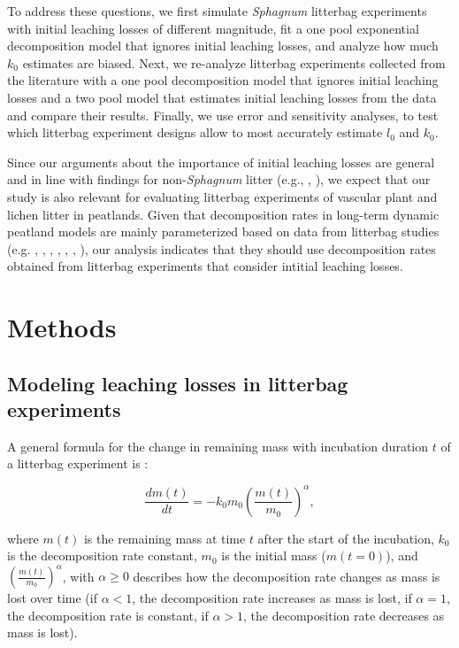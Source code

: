 \documentclass[bg, manuscript]{copernicus}
\begin{document}
To address these questions, we first simulate \emph{Sphagnum} litterbag experiments with initial leaching losses of different magnitude, fit a one pool exponential decomposition model that ignores initial leaching losses, and analyze how much \(k_0\) estimates are biased. Next, we re-analyze litterbag experiments collected from the literature with a one pool decomposition model that ignores initial leaching losses and a two pool model that estimates initial leaching losses from the data and compare their results. Finally, we use error and sensitivity analyses, to test which litterbag experiment designs allow to most accurately estimate \(l_0\) and \(k_0\).

Since our arguments about the importance of initial leaching losses are general and in line with findings for non-\emph{Sphagnum} litter (e.g., \citet{Barlocher.1997}, \citet{Lind.2022}), we expect that our study is also relevant for evaluating litterbag experiments of vascular plant and lichen litter in peatlands. Given that decomposition rates in long-term dynamic peatland models are mainly parameterized based on data from litterbag studies (e.g. \citet{Frolking.2001}, \citet{Bauer.2004}, \citet{Heijmans.2008}, \citet{Heinemeyer.2010}, \citet{Morris.2012}, \citet{Chaudhary.2018}, \citet{Bona.2020}), our analysis indicates that they should use decomposition rates obtained from litterbag experiments that consider intitial leaching losses.

\section{Methods}

\hypertarget{out-methods-1}{%
\subsection{Modeling leaching losses in litterbag experiments}\label{out-methods-1}}

A general formula for the change in remaining mass with incubation duration \(t\) of a litterbag experiment is \citep{Frolking.2001}:

\begin{equation}
\frac{dm(t)}{dt} = -k_0 m_0 \left(\frac{m(t)}{m_0}\right)^\alpha,
\label{eq:decomposition-differential-1}
\end{equation}

where \(m(t)\) is the remaining mass at time \(t\) after the start of the incubation, \(k_0\) is the decomposition rate constant, \(m_0\) is the initial mass (\(m(t = 0)\)), and \(\left(\frac{m(t)}{m_0}\right)^\alpha\), with \(\alpha \ge 0\) describes how the decomposition rate changes as mass is lost over time (if \(\alpha<1\), the decomposition rate increases as mass is lost, if \(\alpha=1\), the decomposition rate is constant, if \(\alpha>1\), the decomposition rate decreases as mass is lost).
\end{document}
